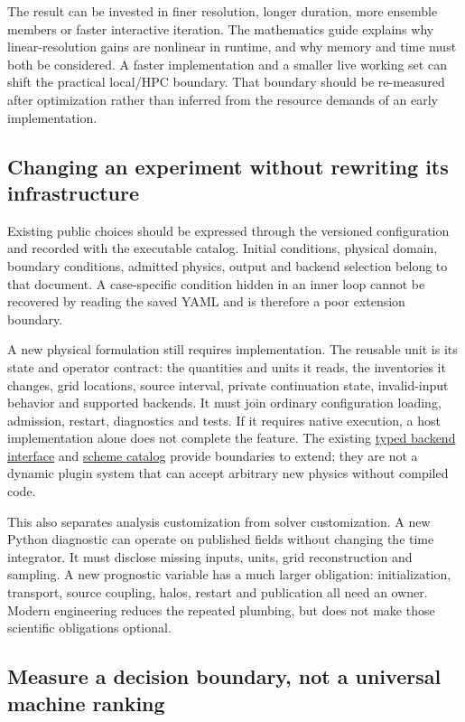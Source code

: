 The result can be invested in finer resolution, longer duration, more ensemble
members or faster interactive iteration. The mathematics guide explains why
linear-resolution gains are nonlinear in runtime, and why memory and time
must both be considered. A faster implementation and a smaller live working
set can shift the practical local/HPC boundary. That boundary should be
re-measured after optimization rather than inferred from the resource demands
of an early implementation.

\subsection{Changing an experiment without rewriting its infrastructure}

Existing public choices should be expressed through the versioned configuration
and recorded with the executable catalog. Initial conditions, physical domain,
boundary conditions, admitted physics, output and backend selection belong to
that document. A case-specific condition hidden in an inner loop cannot be
recovered by reading the saved YAML and is therefore a poor extension boundary.

A new physical formulation still requires implementation. The reusable unit
is its state and operator contract: the quantities and units it reads, the
inventories it changes, grid locations, source interval, private continuation
state, invalid-input behavior and supported backends. It must join ordinary
configuration loading, admission, restart, diagnostics and tests. If it requires
native execution, a host implementation alone does not complete the feature.
The existing \href{../include/compute/backend_interface.hpp}{typed backend
interface} and \href{../src/core/runtime/scheme_catalog.cpp}{scheme catalog}
provide boundaries to extend; they are not a dynamic plugin system that can
accept arbitrary new physics without compiled code.

This also separates analysis customization from solver customization. A new
Python diagnostic can operate on published fields without changing the time
integrator. It must disclose missing inputs, units, grid reconstruction and
sampling. A new prognostic variable has a much larger obligation: initialization,
transport, source coupling, halos, restart and publication all need an owner.
Modern engineering reduces the repeated plumbing, but does not make those
scientific obligations optional.

\subsection{Measure a decision boundary, not a universal machine ranking}


